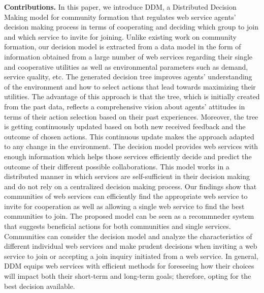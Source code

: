 \documentclass[11pt,onecolumn]{IEEEtran}
\begin{document}
\textbf{Contributions.} In this paper, we introduce DDM, a Distributed Decision Making model for community formation that regulates web service agents’ decision making process in terms of cooperating and deciding which group to join and which service to invite for joining. Unlike existing work on community formation, our decision model is extracted from a data model in the form of information obtained from a large number of web services regarding their single and cooperative utilities as well as environmental parameters such as demand, service quality, etc. The generated decision tree improves agents' understanding of the environment and how to select actions that lead towards maximizing their utilities. The advantage of this approach is that the tree, which is initially created from the past data, reflects a comprehensive vision about agents' attitudes in terms of their action selection based on their past experiences. Moreover, the tree is getting continuously updated based on both new received feedback and the outcome of chosen actions. This continuous update makes the approach adapted to any change in the environment.
The decision model provides web services with enough information which helps those services efficiently decide and predict the outcome of their different possible collaborations. This model works in a distributed manner in which services are self-sufficient in their decision making and do not rely on a centralized decision making process. Our findings show that communities of web services can efficiently find the appropriate web service to invite for cooperation as well as allowing a single web service to find the best communities to join. The proposed model can be seen as a recommneder system that suggests beneficial actions for both communities and single services. Communities can consider the decision model and analyze the characteristics of different individual web services and make prudent decisions when inviting a web service to join or accepting a join inquiry initiated from a web service. In general, DDM equips web services with efficient methods for foreseeing how their choices will impact both their short-term and long-term goals; therefore, opting for the best decision available.
\end{document}

